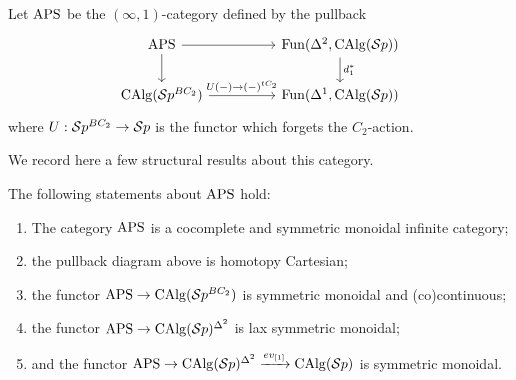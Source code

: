 \begin{defn}
Let $\mathrm{APS}$ be the $(\infty,1)$-category defined by the pullback \[
\begin{tikzcd}
\aps \arrow[rr]\arrow[d] & & \operatorname{Fun}(\Delta^2, \calg(\Sp))\arrow[d,"d_1^*"]\\
\calg(\Sp^{BC_2})\arrow[rr,"U(-)\to (-)^{tC_2}"] & & \operatorname{Fun}(\Delta^1, \calg(\Sp))
\end{tikzcd}
\] where $U:\mathcal{S}p^{BC_2}\to \mathcal{S}p$ is the functor which forgets the $C_2$-action.
\end{defn}

We record here a few structural results about this category.

\begin{thm}
The following statements about $\mathrm{APS}$ hold:
\begin{enumerate}
\item The category $\mathrm{APS}$ is a cocomplete and symmetric monoidal infinite category;
\item the pullback diagram above is homotopy Cartesian;
\item the functor $\mathrm{APS}\to \operatorname{CAlg}(\mathcal{S}p^{BC_2})$ is symmetric monoidal and (co)continuous;
\item the functor $\mathrm{APS}\to \operatorname{CAlg}(\mathcal{S}p)^{\Delta^2}$ is lax symmetric monoidal;
\item and the functor $\mathrm{APS}\to \operatorname{CAlg}(\mathcal{S}p)^{\Delta^2}\xrightarrow{ev_{[1]}} \operatorname{CAlg}(\mathcal{S}p)$ is symmetric monoidal.
\end{enumerate}
\end{thm}

